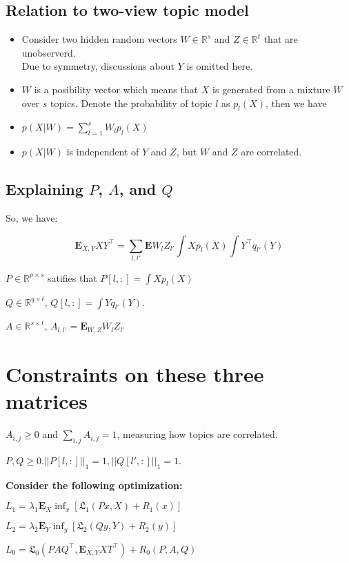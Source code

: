 \documentclass[12pt]{article}
\begin{document}
\subsection{Relation to two-view topic model}
\begin{itemize}
\item Consider two hidden random vectors $W \in \mathbb{R}^s$ and $Z \in \mathbb{R}^t$ that are unobserverd. \\
	Due to symmetry, discussions about $Y$ is omitted here.
\item $W$ is a posibility vector which means that $X$ is generated from a mixture $W$ over $s$ topics. Denote the probability of topic $l$ as $p_l(X)$, then we have
\item $p(X|W) = \sum_{l=1}^s{W_lp_l(X)}$
\item $p(X|W)$ is independent of $Y$ and $Z$, but $W$ and $Z$ are correlated.
\end{itemize}

\subsection{Explaining $P$, $A$, and $Q$}
So, we have:

\begin{equation}
\textbf{E}_{X, Y}{XY^\top}=\sum_{l,l'}{\textbf{E} W_l Z_{l'} \int X p_l(X) \int Y^\top q_{l'}(Y)}
\end{equation}

$P \in \mathbb{R}^{p \times s}$ satifies that $P[l,:]=\int X p_l (X)$

$Q \in \mathbb{R}^{q \times t}$, $Q[l,:]=\int Y q_{l'} (Y)$.

$A \in \mathbb{R}^{s \times t}$, $A_{l, l'}=\textbf{E}_{W,Z}{W_l Z_{l'}}$

\section{Constraints on these three matrices}
$A_{i,j} \ge 0$ and $\sum_{i,j}A_{i,j}=1$, measuring how topics are correlated.

$P, Q \ge 0. ||P[l,:]||_1 = 1, ||Q[l',:]||_1=1$.

\textbf{Consider the following optimization:}


$L_1 = \lambda_1 \textbf{E}_X \inf_x{[\mathfrak{L}_1(Px,X)+R_1(x)]}$

$L_2 = \lambda_2 \textbf{E}_Y \inf_y{[\mathfrak{L}_2(Qy,Y)+R_2(y)]}$

$L_0 = \mathfrak{L}_0(PAQ^\top, \textbf{E}_{X,Y}{XT^\top}) + R_0(P,A,Q)$
\end{document}
